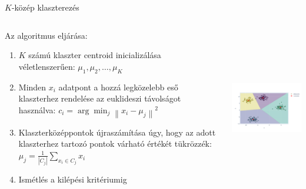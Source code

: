 \documentclass[english, aspectratio=169]{beamer}
\begin{document}
\begin{frame}{$K$-közép klaszterezés}
	\begin{columns}
		\begin{column}{.5\textwidth}
			Az algoritmus eljárása:
			\begin{enumerate}
				\item $K$ számú klaszter centroid inicializálása véletlenszerűen: $\mu_1, \mu_2, \ldots, \mu_K$
				\item Minden $x_i$ adatpont a hozzá legközelebb eső klaszterhez rendelése az euklideszi távolságot használva: $c_i = \arg\min_{j} \left\| x_i - \mu_j \right\|^2$
				\item Klaszterközéppontok újraszámítása úgy, hogy az adott klaszterhez tartozó pontok várható értékét tükrözzék: $\mu_j = \frac{1}{|C_j|} \sum_{x_i \in C_j} x_i$
				\item Ismétlés a kilépési kritériumig
			\end{enumerate}
		\end{column}
		\begin{column}{.5\textwidth}
			\begin{center}
				\includegraphics[width=7cm, height=7cm, keepaspectratio]{images/freq_14.png}
			\end{center}
		\end{column}
	\end{columns}
\end{frame}
\end{document}
